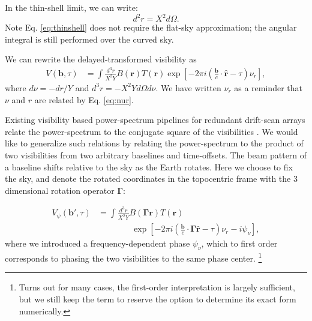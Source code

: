 \documentclass[twocolumn,apj,numberedappendix]{emulateapj}
\renewcommand\[{\begin{equation}}
\renewcommand\]{\end{equation}}
\begin{document}
In the thin-shell limit, we can write:
\begin{equation}
d^2r=X^2d\Omega. 
\label{eq:thinshell}
\end{equation}
Note Eq. \eqref{eq:thinshell} does not require the flat-sky approximation; the angular integral is still performed over the curved sky. 

We can rewrite the delayed-transformed visibility as 
\small
\[
\begin{aligned}V(\boldsymbol{b},\tau) & =\int\frac{d^{3}r}{X^{2}Y}B(\boldsymbol{r})T(\boldsymbol{r})\exp\left[-2\pi i\left(\frac{\boldsymbol{b}}{c}\cdot\hat{\boldsymbol{r}}-\tau\right)\nu_{r}\right],
\end{aligned}
\]
\normalsize
 where $d\nu=-dr/Y$ and $d^{3}r=-X^{2}Yd\Omega d\nu$. 
We have written $\nu_{r}$ as a reminder that $\nu$ and $r$ are related
by Eq. \eqref{eq:nur}. 

Existing visibility based power-spectrum pipelines for redundant drift-scan  arrays relate the power-spectrum to the conjugate square of the visibilities \citep{delay-transform, paper32, Ali2015}. We would like to generalize such relations by relating the power-spectrum to the product of two visibilities from two arbitrary baselines and time-offsets. 
The beam pattern of a baseline shifts relative to the sky as the Earth rotates. Here we choose to fix the sky, and denote the rotated coordinates
in the topocentric frame with the 3 dimensional rotation operator $\boldsymbol{\Gamma}$:

\[
\begin{aligned}V_{\psi}(\boldsymbol{b'},\tau) & = \int\frac{d^{3}r}{X^{2}Y}B(\boldsymbol{\Gamma}\boldsymbol{r})T(\boldsymbol{r})\\
& \qquad \qquad  \exp\left[-2\pi i\left(\frac{\boldsymbol{b}}{c}\cdot\boldsymbol{\Gamma}\hat{\boldsymbol{r}}-\tau\right)\nu_{r}-i\psi_\nu\right],\end{aligned}
\]
where we introduced a frequency-dependent phase $\psi_{\nu}$, which to first order corresponds to phasing the two visibilities to the same phase center. \footnote{Turns out for many cases, the first-order interpretation is largely sufficient, but we still keep the term to reserve the option to determine its exact form numerically. } 
\end{document}
